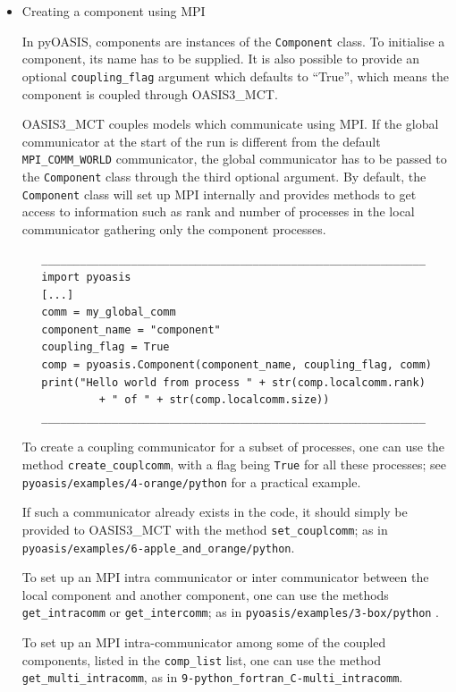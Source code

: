 \begin{itemize}
\item{Creating a component using MPI}
\label{index:creating-a-component-using-mpi}

In pyOASIS, components are instances of the {\tt Component} class. To
initialise a component, its name has to be supplied.
It is also possible to provide an optional  {\tt coupling\_flag} argument which
defaults to “True”, which means the component is coupled through OASIS3\_MCT.

OASIS3\_MCT couples models which communicate using MPI.
If the global communicator at the start of the run is different from
the default  {\tt MPI\_COMM\_WORLD} communicator, the global
communicator has to be passed to the {\tt Component} class through the
third optional argument. By default, the
{\tt Component} class will set up MPI internally and provides methods
to get access to information such as rank and number of processes in
the local communicator gathering only the component processes.

\begin{verbatim}
   ____________________________________________________________
   import pyoasis
   [...]
   comm = my_global_comm
   component_name = "component"
   coupling_flag = True
   comp = pyoasis.Component(component_name, coupling_flag, comm)
   print("Hello world from process " + str(comp.localcomm.rank)
            + " of " + str(comp.localcomm.size))
   ____________________________________________________________
\end{verbatim}

To create a coupling communicator for a subset of processes, one can
use the method {\tt create\_couplcomm}, with a flag being {\tt True} for all these
processes; see {\tt pyoasis/examples/4-orange/python} for a practical example.

If such a communicator already exists in the code, it should simply be
provided to OASIS3\_MCT with the method {\tt set\_couplcomm};
as in {\tt pyoasis/examples/6-apple\_and\_orange/python}.

To set up an MPI intra communicator or inter communicator between the local component and
another component, one can use the methods {\tt get\_intracomm} or {\tt get\_intercomm};
\newline
as in {\tt pyoasis/examples/3-box/python} .

To set up an MPI intra-communicator among some of the coupled components, listed in the {\tt comp\_list}  list,
one can use the method {\tt get\_multi\_intracomm}, as in {\tt 9-python\_fortran\_C-multi\_intracomm}.


\end{itemize}
